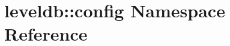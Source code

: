 \hypertarget{namespaceleveldb_1_1config}{}\section{leveldb\+:\+:config Namespace Reference}
\label{namespaceleveldb_1_1config}
